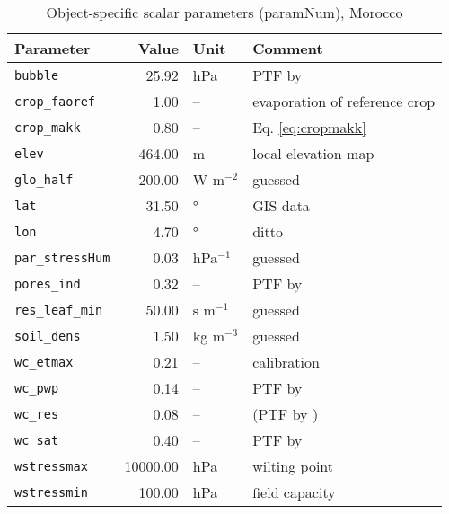 \begin{table}[ht]
\centering
\caption{Object-specific scalar parameters (\textsf{paramNum}), Morocco} 
\label{tab:moroccoMet_paramNum}
\begin{tabular}{lrll}
  \hline
Parameter & Value & Unit & Comment \\ 
  \hline
\verb!bubble! & 25.92 & hPa & PTF by \citet{rawls85} \\ 
  \verb!crop_faoref! & 1.00 & -- & evaporation of reference crop \\ 
  \verb!crop_makk! & 0.80 & -- & Eq. \ref{eq:cropmakk} \\ 
  \verb!elev! & 464.00 & m & local elevation map \\ 
  \verb!glo_half! & 200.00 & W m$^{-2}$ & guessed \\ 
  \verb!lat! & 31.50 & ° & GIS data \\ 
  \verb!lon! & 4.70 & ° & ditto \\ 
  \verb!par_stressHum! & 0.03 & hPa$^{-1}$ & guessed \\ 
  \verb!pores_ind! & 0.32 & -- & PTF by \citet{rawls85} \\ 
  \verb!res_leaf_min! & 50.00 & s m$^{-1}$ & guessed \\ 
  \verb!soil_dens! & 1.50 & kg m$^{-3}$ & guessed \\ 
  \verb!wc_etmax! & 0.21 & -- & calibration \\ 
  \verb!wc_pwp! & 0.14 & -- & PTF by \citet{rawls85} \\ 
  \verb!wc_res! & 0.08 & -- & (PTF by \citet{rawls85}) \\ 
  \verb!wc_sat! & 0.40 & -- & PTF by \citet{woesten99} \\ 
  \verb!wstressmax! & 10000.00 & hPa & wilting point \\ 
  \verb!wstressmin! & 100.00 & hPa & field capacity \\ 
   \hline
\end{tabular}
\end{table}
